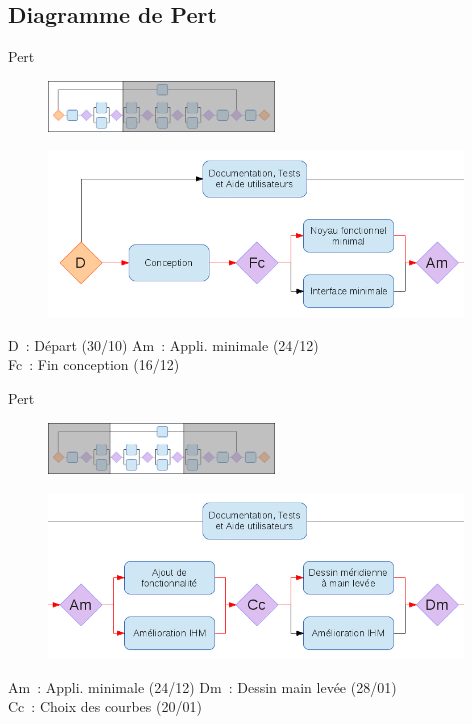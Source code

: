 \documentclass{beamer}
\begin{document}
	\subsection{Diagramme de Pert} 
	\begin{frame}{Pert}
		\begin{figure}
			\includegraphics[width=6cm]
				{../Lancement/ImagesLancement/miniature1.png}
		\end{figure}\begin{figure}
			\includegraphics[width=11cm]
				{../Lancement/ImagesLancement/pert_part_1.png}
		\end{figure}
		\footnotesize{D~: D\'epart (30/10) \hfill Am~: Appli. minimale (24/12)\\
			\hfill Fc~: Fin conception (16/12) \hspace*{\fill}}
	\end{frame}

	\begin{frame}{Pert}
		\begin{figure}
			\includegraphics[width=6cm]
				{../Lancement/ImagesLancement/miniature2.png}
		\end{figure}
		\begin{figure}
			\includegraphics[width=11cm]
				{../Lancement/ImagesLancement/pert_part_2.png}
		\end{figure}
		\footnotesize{Am~: Appli. minimale (24/12) \hfill Dm~: Dessin main 
			lev\'ee (28/01)\\
			\hfill Cc~: Choix des courbes (20/01) \hspace*{\fill}}
	\end{frame}
\end{document}
